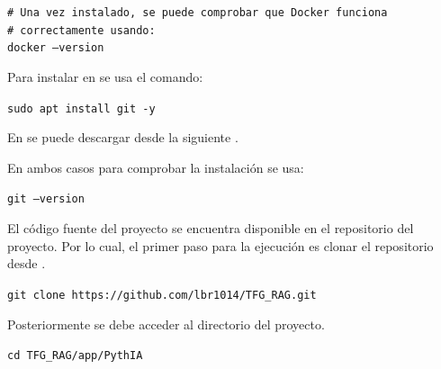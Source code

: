 \begin{tcolorbox}[
	colback=black!3,
	colframe=black!30,
	boxrule=0.5pt,
	arc=2mm,
	title= Terminal,
	fonttitle=\bfseries,
	breakable
]
	{\footnotesize
		\noindent
		\texttt{\# Una vez instalado, se puede comprobar que Docker funciona}\\
		\texttt{\# correctamente usando:} \\
		\texttt{docker --version}
	}
\end{tcolorbox}

Para instalar  en  se usa el comando:

\begin{tcolorbox}[
	colback=black!3,
	colframe=black!30,
	boxrule=0.5pt,
	arc=2mm,
	title= Terminal,
	fonttitle=\bfseries,
	breakable
]
	{\footnotesize
		\noindent
		\texttt{sudo apt install git -y}
	}
\end{tcolorbox}

En  se puede descargar desde la siguiente .

En ambos casos para comprobar la instalación se usa:

\begin{tcolorbox}[
	colback=black!3,
	colframe=black!30,
	boxrule=0.5pt,
	arc=2mm,
	title= Terminal,
	fonttitle=\bfseries,
	breakable
]
	{\footnotesize
		\noindent
		\texttt{git --version}
	}
\end{tcolorbox}

El código fuente del proyecto se encuentra disponible en el repositorio  del proyecto. Por lo cual, el primer paso para la ejecución es clonar el repositorio desde . 

\begin{tcolorbox}[
	colback=black!3,
	colframe=black!30,
	boxrule=0.5pt,
	arc=2mm,
	title= Terminal,
	fonttitle=\bfseries,
	breakable
]
	{\footnotesize
		\noindent
		\texttt{git clone https://github.com/lbr1014/TFG\_RAG.git}
	}
\end{tcolorbox}

Posteriormente se debe acceder al directorio del proyecto.

\begin{tcolorbox}[
	colback=black!3,
	colframe=black!30,
	boxrule=0.5pt,
	arc=2mm,
	title= Terminal,
	fonttitle=\bfseries,
	breakable
]
	{\footnotesize
		\noindent
		\texttt{cd TFG\_RAG/app/PythIA}
	}
\end{tcolorbox}

